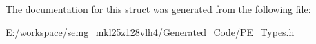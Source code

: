 The documentation for this struct was generated from the following file\-:\begin{DoxyCompactItemize}
\item 
E\-:/workspace/semg\-\_\-mkl25z128vlh4/\-Generated\-\_\-\-Code/\hyperlink{_p_e___types_8h}{P\-E\-\_\-\-Types.\-h}\end{DoxyCompactItemize}
